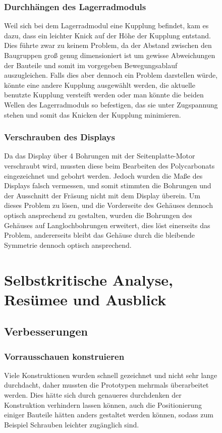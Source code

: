\begin{figure}
\subsubsection{Durchhängen des Lagerradmoduls}
Weil sich bei dem Lagerradmodul eine Kupplung befindet, kam es dazu, dass ein leichter Knick
auf der Höhe der Kupplung entstand. Dies führte zwar zu keinem Problem, da der Abstand zwischen
den Baugruppen groß genug dimensioniert ist um gewisse Abweichungen der Bauteile und somit im
vorgegeben Bewegungsablauf auszugleichen. Falls dies aber dennoch ein Problem darstellen würde,
könnte eine andere Kupplung ausgewählt werden, die aktuelle benutzte Kupplung versteift werden oder
man könnte die beiden Wellen des Lagerradmoduls so befestigen, das sie unter
Zugspannung stehen und somit das Knicken der Kupplung minimieren.

\subsubsection{Verschrauben des Displays}
Da das Display über 4 Bohrungen mit der Seitenplatte-Motor verschraubt wird, mussten diese
beim Bearbeiten des Polycarbonats eingezeichnet und gebohrt werden. Jedoch wurden
die Maße des Displays falsch vermessen, und somit stimmten die Bohrungen und der Ausschnitt
der Fräsung nicht mit dem Display überein. Um dieses Problem zu lösen, und die
Vorderseite des Gehäuses dennoch optisch ansprechend zu gestalten, wurden die Bohrungen
des Gehäuses auf Langlochbohrungen erweitert, dies löst einerseits das Problem, andererseits
bleibt das Gehäuse durch die bleibende Symmetrie dennoch optisch ansprechend.

\section{Selbstkritische Analyse, Resümee und Ausblick}
\subsection{Verbesserungen}

\subsubsection{Vorrausschauen konstruieren}
Viele Konstruktionen wurden schnell gezeichnet und nicht sehr lange durchdacht, daher mussten die Prototypen mehrmals überarbeitet werden.
Dies hätte sich durch genaueres durchdenken der Konstruktion verhindern lassen können, auch die Positionierung
einiger Bauteile hätten anders gestaltet werden können, sodass zum Beispiel Schrauben leichter zugänglich sind.


\end{figure}

